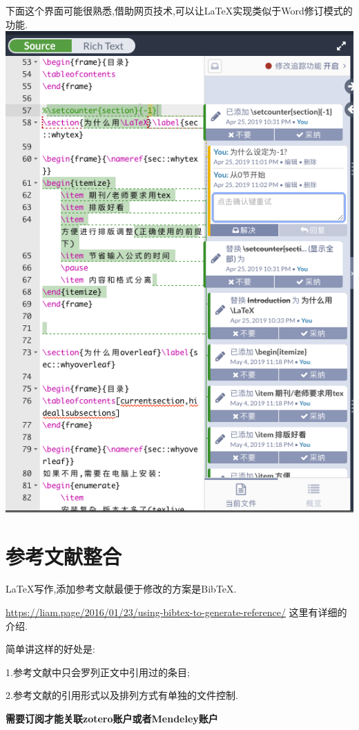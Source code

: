 \documentclass[]{ctexbook}
\begin{document}
下面这个界面可能很熟悉,借助网页技术,可以让LaTeX实现类似于Word修订模式的功能.
\includegraphics{figure/review.png}

\hypertarget{refe}{%
\section{参考文献整合}\label{refe}}

LaTeX写作,添加参考文献最便于修改的方案是BibTeX.

\url{https://liam.page/2016/01/23/using-bibtex-to-generate-reference/}
这里有详细的介绍.

简单讲这样的好处是:

1.参考文献中只会罗列正文中引用过的条目;

2.参考文献的引用形式以及排列方式有单独的文件控制.

\textbf{需要订阅才能关联zotero账户或者Mendeley账户}
\end{document}
